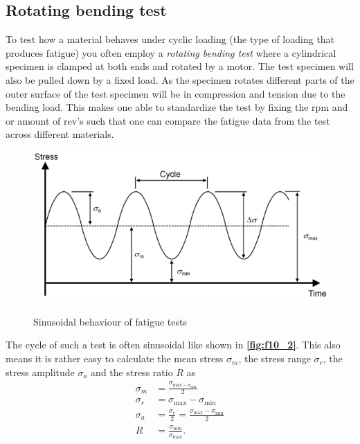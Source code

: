 \subsection{Rotating bending test}
To test how a material behaves under cyclic loading (the type of loading that produces fatigue) you often employ a \textit{rotating bending test} where a cylindrical specimen is clamped at both ends and rotated by a motor. The test specimen will also be pulled down by a fixed load. As the specimen rotates different parts of the outer surface of the test specimen will be in compression and tension due to the bending load. This makes one able to standardize the test by fixing the \unit{rpm} and or amount of \unit{rev}'s such that one can compare the fatigue data from the test across different materials.
\begin{figure} [ht]
  \centering
  \caption{Sinusoidal behaviour of fatigue tests}
  \includegraphics[width=0.5\linewidth]{./figures/f10_2.png}
  \label{fig:f10_2}
\end{figure}
The cycle of such a test is often sinusoidal like shown in \textbf{\autoref{fig:f10_2}}. This also means it is rather easy to calculate the mean stress $\sigma_m$, the stress range $\sigma_r$, the stress amplitude $\sigma_a$ and the stress ratio $R$ as
\begin{align*}
  \sigma_m &= \frac{\sigma_{\mathrm{max} - \sigma_{\mathrm{min}}}}{2} \\
  \sigma_r &= \sigma_{\mathrm{max}} - \sigma_{\mathrm{min}} \\
  \sigma_a &= \frac{\sigma_r}{2} = \frac{\sigma_{\mathrm{max}} - \sigma_{\mathrm{min}}}{2} \\
  R &= \frac{\sigma_{\mathrm{min}}}{\sigma_{\mathrm{max}}}
.\end{align*}


